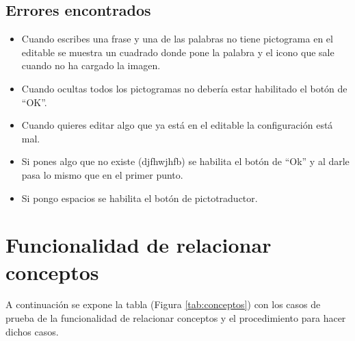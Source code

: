 \subsection{Errores encontrados}
\label{errores:pictotra}
\begin{itemize}
    \item Cuando escribes una frase y una de las palabras no tiene pictograma en el editable se muestra un cuadrado donde pone la palabra y el icono que sale cuando no ha cargado la imagen.
    \item Cuando ocultas todos los pictogramas no debería estar habilitado el botón de ``OK''.
    \item  Cuando quieres editar algo que ya está en el editable la configuración está mal.
    \item Si pones algo que no existe (djfhwjhfb) se habilita el botón de ``Ok'' y al darle pasa lo mismo que en el primer punto.
    \item  Si pongo espacios se habilita el botón de pictotraductor.
\end{itemize}


\section{Funcionalidad de relacionar conceptos}
\label{planPruebas:conceptos}
A continuación se expone la tabla (Figura \ref{tab:conceptos}) con los casos de prueba de la funcionalidad de relacionar conceptos y el procedimiento para hacer dichos casos.

